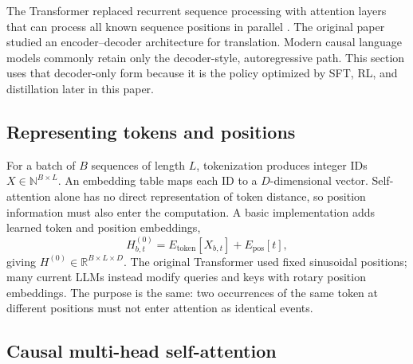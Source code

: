 The Transformer replaced recurrent sequence processing with attention layers that can
process all known sequence positions in parallel \citep{vaswani2017attention}. The
original paper studied an encoder--decoder architecture for translation. Modern causal
language models commonly retain only the decoder-style, autoregressive path. This section
uses that decoder-only form because it is the policy optimized by SFT, RL, and
distillation later in this paper.

\subsection{Representing tokens and positions}

For a batch of $B$ sequences of length $L$, tokenization produces integer IDs
$X\in\mathbb{N}^{B\times L}$. An embedding table maps each ID to a $D$-dimensional
vector. Self-attention alone has no direct representation of token distance, so position
information must also enter the computation. A basic implementation adds learned token
and position embeddings,
\begin{equation}
  H^{(0)}_{b,t}=E_{\mathrm{token}}[X_{b,t}]+E_{\mathrm{pos}}[t],
\end{equation}
giving $H^{(0)}\in\mathbb{R}^{B\times L\times D}$. The original Transformer used fixed
sinusoidal positions; many current LLMs instead modify queries and keys with rotary
position embeddings. The purpose is the same: two occurrences of the same token at
different positions must not enter attention as identical events.

\subsection{Causal multi-head self-attention}

